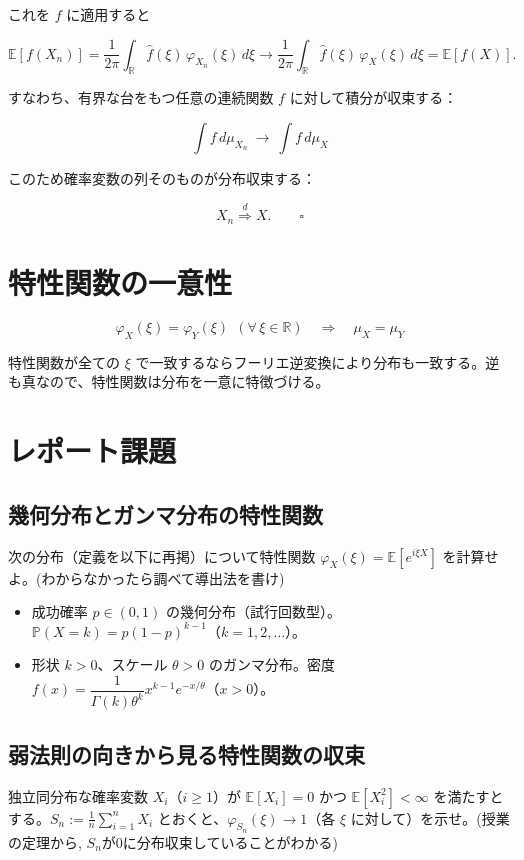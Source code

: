 \documentclass[uplatex,dvipdfmx,11pt,a4paper,openany]{bxjsbook}
\begin{document}
これを \(f\) に適用すると

\[
                \mathbb{E}[f(X_n)]
                =\frac{1}{2\pi}\int_{\mathbb{R}} \hat f(\xi)\,\varphi_{X_n}(\xi)\,d\xi
                \longrightarrow
                \frac{1}{2\pi}\int_{\mathbb{R}} \hat f(\xi)\,\varphi_{X}(\xi)\,d\xi
                =\mathbb{E}[f(X)].
                \]

すなわち、有界な台をもつ任意の連続関数 \(f\) に対して積分が収束する：

\[
                \int f\,d\mu_{X_n}\ \longrightarrow\ \int f\,d\mu_X
                \]

このため確率変数の列そのものが分布収束する：

\[
                X_n\overset{d}{\Rightarrow} X.
                \qquad\square
                \]

\section{特性関数の一意性}
\[\varphi_X(\xi)=\varphi_Y(\xi)\ \ (\forall\,\xi\in\mathbb{R})\quad\Longrightarrow\quad \mu_X=\mu_Y\]

特性関数が全ての \(\xi\) で一致するならフーリエ逆変換により分布も一致する。逆も真なので、特性関数は分布を一意に特徴づける。

\section{レポート課題}
\subsection{幾何分布とガンマ分布の特性関数}
次の分布（定義を以下に再掲）について特性関数 \(\varphi_X(\xi)=\mathbb{E}[e^{i\xi X}]\) を計算せよ。(わからなかったら調べて導出法を書け)

\begin{itemize}
\item 成功確率 \(p\in(0,1)\) の幾何分布（試行回数型）。\(\mathbb{P}(X=k)=p(1-p)^{k-1}\)（\(k=1,2,\dots\)）。
\item 形状 \(k>0\)、スケール \(\theta>0\) のガンマ分布。密度 \(f(x)=\dfrac{1}{\Gamma(k)\theta^k}x^{k-1}e^{-x/\theta}\)（\(x>0\)）。
\end{itemize}

\subsection{弱法則の向きから見る特性関数の収束}
独立同分布な確率変数 \(X_i\)（\(i\ge 1\)）が \(\mathbb{E}[X_i]=0\) かつ \(\mathbb{E}[X_i^2]<\infty\) を満たすとする。\(S_n := \tfrac{1}{n}\sum_{i=1}^n X_i\) とおくと、\(\varphi_{S_n}(\xi)\to 1\)（各 \(\xi\) に対して）を示せ。(授業の定理から, $S_n$が$0$に分布収束していることがわかる)
\end{document}
